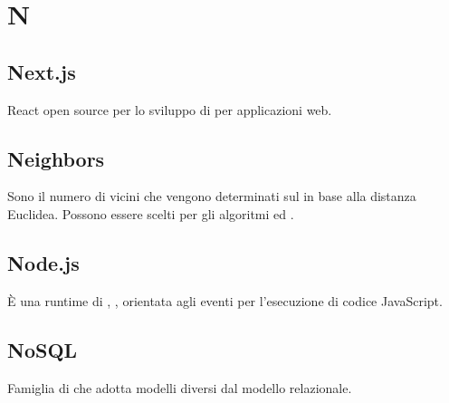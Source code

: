\section*{N}
\markright{}

\subsection*{Next.js}
 React open source per lo sviluppo di  per applicazioni web. 

\subsection*{Neighbors}
Sono il numero di vicini che vengono determinati sul  in base alla distanza Euclidea. Possono essere scelti per gli algoritmi  ed .

\subsection*{Node.js}
È una runtime  di , , orientata agli eventi per l'esecuzione di codice JavaScript.

\subsection*{NoSQL}
Famiglia di  che adotta modelli diversi dal modello relazionale.